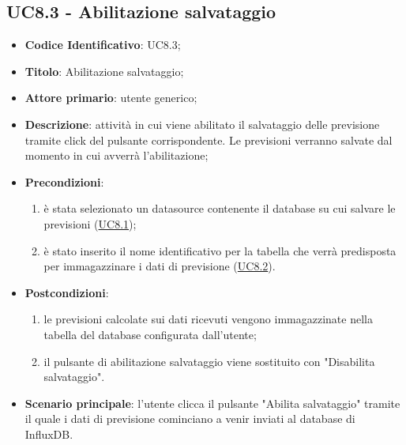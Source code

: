 	\label{par:UC8.3}
	\subsection{UC8.3 - Abilitazione salvataggio}
		\begin{itemize}
			\item\textbf{Codice Identificativo}: UC8.3;
			\item\textbf{Titolo}: Abilitazione salvataggio;
			\item\textbf{Attore primario}: utente generico;
			\item\textbf{Descrizione}: attività in cui viene abilitato il salvataggio delle previsione tramite click del pulsante corrispondente. Le previsioni verranno salvate dal momento in cui avverrà l'abilitazione;
			\item\textbf{Precondizioni}:
				\begin{enumerate}
					\item è stata selezionato un datasource contenente il database su cui salvare le previsioni (\hyperref[par:UC8.1]{UC8.1});
					\item è stato inserito il nome identificativo per la tabella che verrà predisposta per immagazzinare i dati di previsione (\hyperref[par:UC8.2]{UC8.2}).
				\end{enumerate}
			\item\textbf{Postcondizioni}: 
			\begin{enumerate}
			\item le previsioni calcolate sui dati ricevuti vengono immagazzinate nella tabella del database configurata dall'utente;
			\item il pulsante di abilitazione salvataggio viene sostituito con "Disabilita salvataggio".
			\end{enumerate}
			\item\textbf{Scenario principale}: l'utente clicca il pulsante "Abilita salvataggio" tramite il quale i dati di previsione cominciano a venir inviati al database di InfluxDB.		
		\end{itemize}	
		
	\label{par:UC8.4}

